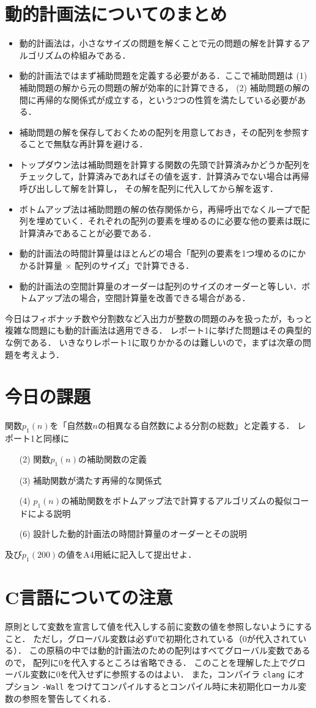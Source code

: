 \documentclass[a4paper,twoside,onecolumn,openany,article]{memoir}
\theoremstyle{remark}
\begin{document}
\section{動的計画法についてのまとめ}
\begin{itemize}
\item 動的計画法は，小さなサイズの問題を解くことで元の問題の解を計算するアルゴリズムの枠組みである．
\item 動的計画法ではまず補助問題を定義する必要がある．ここで補助問題は (1) 補助問題の解から元の問題の解が効率的に計算できる，
(2) 補助問題の解の間に再帰的な関係式が成立する，という2つの性質を満たしている必要がある．
\item 補助問題の解を保存しておくための配列を用意しておき，その配列を参照することで無駄な再計算を避ける．
\item トップダウン法は補助問題を計算する関数の先頭で計算済みかどうか配列をチェックして，計算済みであればその値を返す．計算済みでない場合は再帰呼び出しして解を計算し，
その解を配列に代入してから解を返す．
\item ボトムアップ法は補助問題の解の依存関係から，再帰呼出でなくループで配列を埋めていく．それぞれの配列の要素を埋めるのに必要な他の要素は既に計算済みであることが必要である．
\item 動的計画法の時間計算量はほとんどの場合「配列の要素を1つ埋めるのにかかる計算量 $\times$ 配列のサイズ」で計算できる．
\item 動的計画法の空間計算量のオーダーは配列のサイズのオーダーと等しい．ボトムアップ法の場合，空間計算量を改善できる場合がある．
\end{itemize}
今日はフィボナッチ数や分割数など入出力が整数の問題のみを扱ったが，もっと複雑な問題にも動的計画法は適用できる．
レポート1に挙げた問題はその典型的な例である．
いきなりレポート1に取りかかるのは難しいので，まずは次章の問題を考えよう．


\section{今日の課題}\label{sec:assignment}
関数$p_1(n)$を「自然数$n$の相異なる自然数による分割の総数」と定義する．
レポート1と同様に
\begin{enumerate}
\item[(2)] 関数$p_1(n)$の補助関数の定義
\item[(3)] 補助関数が満たす再帰的な関係式
\item[(4)] $p_1(n)$の補助関数をボトムアップ法で計算するアルゴリズムの擬似コードによる説明
\item[(6)] 設計した動的計画法の時間計算量のオーダーとその説明
\end{enumerate}
及び$p_1(200)$の値をA4用紙に記入して提出せよ．

\section*{C言語についての注意}
原則として変数を宣言して値を代入しする前に変数の値を参照しないようにすること．
ただし，グローバル変数は必ず0で初期化されている（0が代入されている）．
この原稿の中では動的計画法のための配列はすべてグローバル変数であるので，
配列に0を代入するところは省略できる．
このことを理解した上でグローバル変数に0を代入せずに参照するのはよい．
また，コンパイラ \texttt{clang} にオプション \texttt{-Wall} をつけてコンパイルするとコンパイル時に未初期化ローカル変数の参照を警告してくれる．
\end{document}
